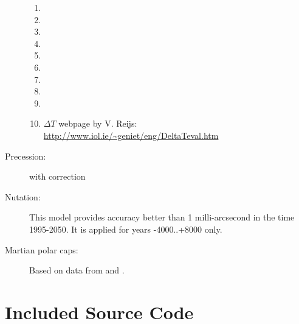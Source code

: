 \begin{description}
\begin{enumerate}
		\item {}%
		\item {} %
		\item {} %
		\item {} %
		\item {} %
		\item {}  %
		\item {} %
		\item {} %
		\item {} %
		\item $\Delta T$ webpage by V. Reijs: \url{http://www.iol.ie/~geniet/eng/DeltaTeval.htm}
		\end{enumerate}
	\item[Precession:]  with correction \citep{2012AA:Vondrak} 
	\item[Nutation:]    %
		This model provides accuracy better than 1 milli-arcsecond in the
		time 1995-2050. It is applied for years -4000..+8000 only.
        \item[Martian polar caps:] Based on data from \citet{MarsPoles:2009} and \citet{MarsRotation:2015}.
\end{description}		
		
\section{Included Source Code}
\label{sec:ack:code}

